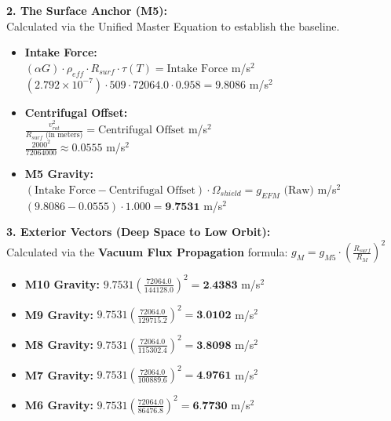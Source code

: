 \documentclass[11pt, a4paper]{article}
\begin{document}
  \vspace{1.0em}
  \noindent \textbf{2. The Surface Anchor (M5):} \\
  \hspace*{1em} Calculated via the Unified Master Equation to establish the baseline.
  \begin{itemize}
    \item \textbf{Intake Force:} \\[0.5em]
    \hspace*{2em} $(\alpha G) \cdot \rho_{eff} \cdot R_{surf} \cdot \tau(T) = \text{Intake Force}$ m/s$^2$ \\[1em]
    \hspace*{2em} $(2.792 \times 10^{-7}) \cdot 509 \cdot 72064.0 \cdot 0.958 = 9.8086$ m/s$^2$
    
    \item \textbf{Centrifugal Offset:} \\[0.5em]
    \hspace*{2em} $\frac{v_{rot}^2}{R_{surf} \text{ (in meters)}} = \text{Centrifugal Offset}$ m/s$^2$ \\[1em]
    \hspace*{2em} $\frac{2000^2}{72064000} \approx 0.0555$ m/s$^2$
    
    \item \textbf{M5 Gravity:} \\[0.5em]
    \hspace*{2em} $(\text{Intake Force} - \text{Centrifugal Offset}) \cdot \Omega_{shield} = g_{EFM} \text{ (Raw)}$ m/s$^2$ \\[1em]
    \hspace*{2em} $(9.8086 - 0.0555) \cdot 1.000 = \textbf{9.7531}$ m/s$^2$
  \end{itemize}

  \clearpage
  \noindent \textbf{3. Exterior Vectors (Deep Space to Low Orbit):} \\
  \hspace*{1em} Calculated via the \textbf{Vacuum Flux Propagation} formula: $g_M = g_{M5} \cdot \left( \frac{R_{surf}}{R_M} \right)^2$
  \begin{itemize}
    \item \textbf{M10 Gravity:} $9.7531 \left( \frac{72064.0}{144128.0} \right)^2 = \textbf{2.4383}$ m/s$^2$
    \item \textbf{M9 Gravity:} $9.7531 \left( \frac{72064.0}{129715.2} \right)^2 = \textbf{3.0102}$ m/s$^2$
    \item \textbf{M8 Gravity:} $9.7531 \left( \frac{72064.0}{115302.4} \right)^2 = \textbf{3.8098}$ m/s$^2$
    \item \textbf{M7 Gravity:} $9.7531 \left( \frac{72064.0}{100889.6} \right)^2 = \textbf{4.9761}$ m/s$^2$
    \item \textbf{M6 Gravity:} $9.7531 \left( \frac{72064.0}{86476.8} \right)^2 = \textbf{6.7730}$ m/s$^2$
  \end{itemize}
\end{document}
